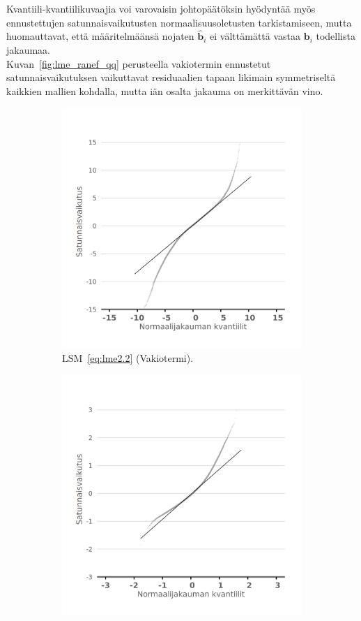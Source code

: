 \documentclass[finnish]{docopts}
\begin{document}
Kvantiili-kvantiilikuvaajia voi varovaisin johtopäätöksin hyödyntää myös ennustettujen satunnaisvaikutusten normaalisuusoletusten tarkistamiseen, mutta \cite{burzykowski13} huomauttavat, että määritelmäänsä nojaten $\hat{\bm{b}}_i$ ei välttämättä vastaa $\bm{b}_i$ todellista jakaumaa.\\

Kuvan~\ref{fig:lme_ranef_qq} perusteella vakiotermin ennustetut satunnaisvaikutuksen vaikuttavat residuaalien tapaan likimain symmetriseltä kaikkien mallien kohdalla, mutta iän osalta jakauma on merkittävän vino.\\

\begin{figure}[H]
\centering
\begin{subfigure}[b]{0.4\textwidth}
\centering
  \includegraphics[width=.8\linewidth]{kuvaajat/lme3_qq_ranef_int.png}
  \caption{$\text{LSM}$~\ref{eq:lme2.2} (Vakiotermi).}
  \label{fig:lme_krit_int_qq}
\end{subfigure}%
\begin{subfigure}[b]{0.4\textwidth}
\centering
  \includegraphics[width=.8\linewidth]{kuvaajat/lme3_qq_ranef_ika.png}

\end{subfigure}
\end{figure}
\end{document}
